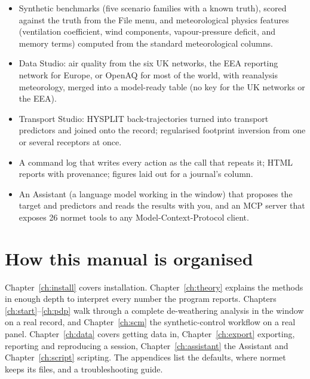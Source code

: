 \documentclass[11pt]{report}
\newcommand{\nm}{\textsf{normet}}
\begin{document}
\begin{itemize}
        completion, robust SCM, ML-SCM and Bayesian SCM, with placebo-in-space and
        placebo-in-time tests, jackknife and bootstrap bands, and an all-units batch.
        A de-weathered backend removes the weather before the donors are fitted, and
        a transport backend adjusts for downwind plume spillover.
  \item Synthetic benchmarks (five scenario families with a known truth), scored
        against the truth from the File menu, and meteorological physics features
        (ventilation coefficient, wind components, vapour-pressure deficit, and
        memory terms) computed from the standard meteorological columns.
  \item Data Studio: air quality from the six UK networks, the EEA reporting network
        for Europe, or OpenAQ for most of the world, with reanalysis meteorology,
        merged into a model-ready table (no key for the UK networks or the EEA).
  \item Transport Studio: HYSPLIT back-trajectories turned into transport predictors
        and joined onto the record; regularised footprint inversion from one or
        several receptors at once.
  \item A command log that writes every action as the call that repeats it; HTML
        reports with provenance; figures laid out for a journal's column.
  \item An Assistant (a language model working in the window) that proposes the
        target and predictors and reads the results with you, and an MCP server that
        exposes 26 \nm{} tools to any Model-Context-Protocol client.
\end{itemize}

\section{How this manual is organised}
Chapter~\ref{ch:install} covers installation. Chapter~\ref{ch:theory} explains the
methods in enough depth to interpret every number the program reports. Chapters
\ref{ch:start}--\ref{ch:pdp} walk through a complete de-weathering analysis in the
window on a real record, and Chapter~\ref{ch:scm} the synthetic-control workflow on a
real panel. Chapter~\ref{ch:data} covers getting data in, Chapter~\ref{ch:export}
exporting, reporting and reproducing a session, Chapter~\ref{ch:assistant} the
Assistant and Chapter~\ref{ch:script} scripting. The appendices list the defaults, where
\nm{} keeps its files, and a troubleshooting guide.
\end{document}
